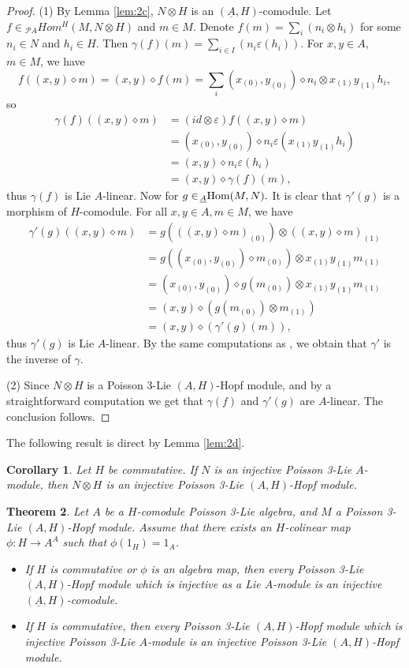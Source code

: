 \documentclass[11pt]{article}
\newtheorem{theorem}{Theorem}[section]
\newtheorem{corollary}[theorem]{Corollary}
\def\di{\diamond}
\def\ot{\otimes}
\begin{document}
\begin{proof}
(1) By Lemma \ref{lem:2c}, $N \otimes H$ is an $(\underline{A}, H)$-comodule. Let $f \in\! _{\mathcal{P}A}Hom^H(M, N \otimes H)$ and $m \in M$. Denote $ f(m) = \sum_{i} (n_i \otimes h_i)$ for some $n_i \in N$ and $h_i \in H$. Then $\gamma(f)(m) = \sum_{i \in I} (n_i \varepsilon(h_i))$. For $x,y\in A$, $m \in M$, we have
$$f((x,y)\di m)=(x,y)\diamond f(m)=\sum_{i} (x_{(0)},y_{(0)}) \di n_i\otimes x_{(1)}y_{(1)}h_i,$$
so
\begin{align*}
\gamma(f)((x,y)\di m)&=(id\ot\varepsilon)f((x,y)\di m)\\
&=(x_{(0)},y_{(0)}) \di n_i\varepsilon(x_{(1)}y_{(1)}h_i)\\
&=(x,y) \di n_i\varepsilon(h_i)\\
&=(x,y) \di \gamma(f)(m),
\end{align*}
thus $\gamma(f)$ is Lie $A$-linear. Now for $g\in\! _{\underline{A}}\textup{Hom}(M,N).$ It is clear that $\gamma'(g)$ is a morphism of $H$-comodule. For all $x,y\in A,m\in M$, we have
\begin{align*}
\gamma'(g)((x,y)\di m)&=g(((x,y)\di m)_{(0)})\ot((x,y)\di m)_{(1)}\\
&=g((x_{(0)},y_{(0)})\di m_{(0)})\ot x_{(1)}y_{(1)} m_{(1)}\\
&=(x_{(0)},y_{(0)})\di g( m_{(0)})\ot  x_{(1)}y_{(1)}  m_{(1)}\\
&=(x,y)\di (g( m_{(0)})\ot m_{(1)})\\
&=(x,y)\di (\gamma'(g)(m)),
\end{align*}
thus $\gamma'(g)$ is Lie $A$-linear. 
By the same computations as \cite{Gu}, we obtain that $\gamma'$ is the inverse of $\gamma$.

(2) Since $N\ot H$ is a Poisson 3-Lie $(A,H)$-Hopf module, and by a straightforward computation we get that $\gamma(f)$ and $\gamma'(g)$ are $A$-linear. The conclusion follows.
\end{proof}

The following result is direct by Lemma \ref{lem:2d}.
\begin{corollary}\label{cor:2c}
Let $H$ be commutative. If $N$ is an injective Poisson 3-Lie $A$-module, then $N\ot H$ is an injective Poisson 3-Lie $(A, H)$-Hopf module.
\end{corollary}

\begin{theorem}\label{thm:2d}
Let $A$ be a $H$-comodule Poisson 3-Lie algebra, and $M$ a Poisson 3-Lie $(A, H)$-Hopf module. Assume that there exists an $H$-colinear map $\phi:H\rightarrow A^A$ such that $\phi(1_H)=1_A$.
\begin{itemize}
  \item [(1)]  If $H$ is commutative or $\phi$ is an algebra map, then every Poisson 3-Lie $(A, H)$-Hopf module which is injective as a Lie $A$-module is an injective $(\underline{A}, H)$-comodule.
  \item [(2)] If $H$ is commutative, then every Poisson 3-Lie $(A, H)$-Hopf module which is injective Poisson 3-Lie $A$-module is an injective Poisson 3-Lie $(A, H)$-Hopf module.
\end{itemize}
\end{theorem}
\end{document}
